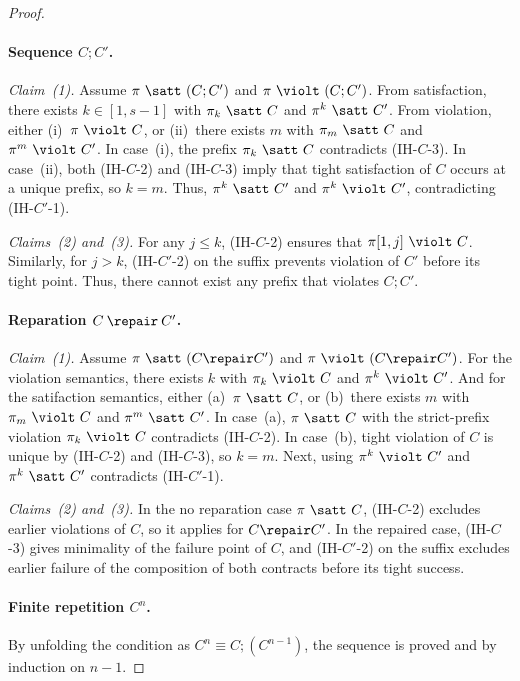 \begin{proof}
\paragraph{Sequence $C\mathbin{;}C'$.}
\emph{Claim~(1).}
Assume $\pi\ \satt\ (C;C')$ and $\pi\ \violt\ (C;C')$.
From satisfaction, there exists $k\in[1,s{-}1]$ with $\pi_k\ \satt\ C$ and $\pi^{k}\ \satt\ C'$.
From violation, either (i)~$\pi\ \violt\ C$, or (ii)~there exists $m$ with $\pi_m\ \satt\ C$ and $\pi^{m}\ \violt\ C'$.
In case~(i), the prefix $\pi_k\ \satt\ C$ contradicts (IH-$C$-3).
In case~(ii), both (IH-$C$-2) and (IH-$C$-3) imply that tight satisfaction of $C$ occurs at a unique prefix, so $k = m$. Thus, $\pi^{k}\ \satt\ C'$ and $\pi^{k}\ \violt\ C'$, contradicting (IH-$C'$-1).

\emph{Claims~(2) and~(3).}
For any $j \le k$, (IH-$C$-2) ensures that $\pi[1,j]\ \violt\ C$. Similarly, for $j > k$, (IH-$C'$-2) on the suffix prevents violation of $C'$ before its tight point. Thus, there cannot exist any prefix that violates $C;C'$.


\paragraph{Reparation $C\mathbin{\repair} C'$.}
\emph{Claim~(1).}
Assume $\pi\ \satt\ (C\repair C')$ and $\pi\ \violt\ (C\repair C')$.
For the violation semantics, there exists $k$ with $\pi_k\ \violt\ C$ and $\pi^{k}\ \violt\ C'$.
And for the satifaction semantics, either (a)~$\pi\ \satt\ C$, or (b)~there exists $m$ with $\pi_m\ \violt\ C$ and $\pi^{m}\ \satt\ C'$.
In case~(a), $\pi\ \satt\ C$ with the strict-prefix violation $\pi_k\ \violt\ C$ contradicts (IH-$C$-2).
In case~(b), tight violation of $C$ is unique by (IH-$C$-2) and (IH-$C$-3), so $k = m$.
Next, using $\pi^{k}\ \violt\ C'$ and $\pi^{k}\ \satt\ C'$ contradicts (IH-$C'$-1).

\emph{Claims~(2) and~(3).}
In the no reparation case $\pi\ \satt\ C$, (IH-$C$-2) excludes earlier violations of $C$, so it applies for $C\repair C'$.
In the repaired case, (IH-$C$-3) gives minimality of the failure point of $C$, and (IH-$C'$-2) on the suffix excludes earlier failure of the composition of both contracts before its tight success.


\paragraph{Finite repetition $C^n$.}
By unfolding the condition as $C^n \equiv C;(C^{n-1})$, the sequence is proved and by induction on $n-1$.


\end{proof}
